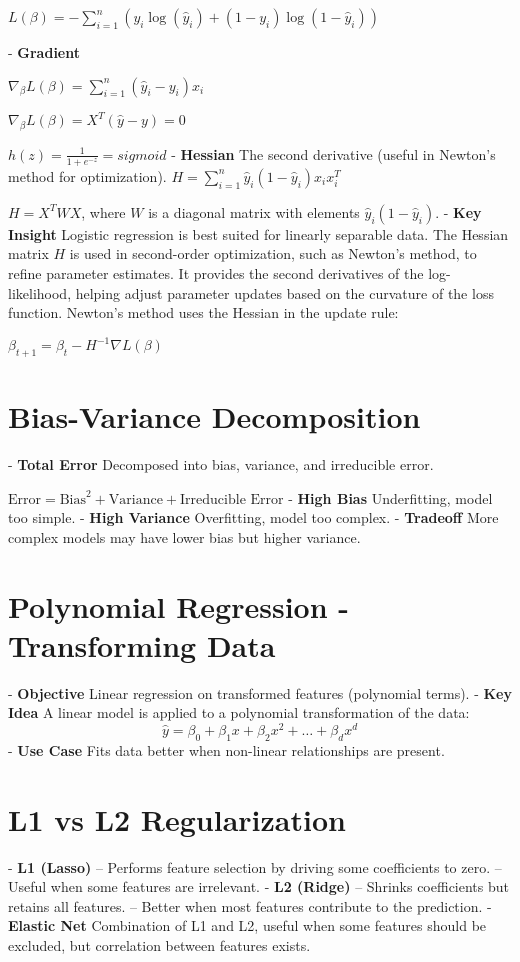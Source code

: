 \documentclass[10pt]{article}
\begin{document}
\begin{multicols}{2}
  $L(\beta) = - \sum_{i=1}^{n} \left( y_i \log(\hat{y}_i) + (1 - y_i) \log(1 - \hat{y}_i) \right)$
  
- \textbf{Gradient} 
  
  $\nabla_{\beta} L(\beta) = \sum_{i=1}^{n} \left( \hat{y}_i - y_i \right) x_i$
  
  $\nabla_{\beta} L(\beta) = X^T (\hat{y} - y) = 0$

  $h(z) = \frac{1}{1 + e^{-z}} = sigmoid$
- \textbf{Hessian} The second derivative (useful in Newton’s method for optimization).
  $H = \sum_{i=1}^{n} \hat{y}_i (1 - \hat{y}_i) x_i x_i^T$
  
  $H = X^T W X$, where $W$ is a diagonal matrix with elements $\hat{y}_i(1 - \hat{y}_i)$.
- \textbf{Key Insight} Logistic regression is best suited for linearly separable data. The Hessian matrix \( H \) is used in second-order optimization, such as Newton’s method, to refine parameter estimates. It provides the second derivatives of the log-likelihood, helping adjust parameter updates based on the curvature of the loss function.
Newton's method uses the Hessian in the update rule:

$\beta_{t+1} = \beta_t - H^{-1} \nabla L(\beta)$

\section*{Bias-Variance Decomposition}
- \textbf{Total Error} Decomposed into bias, variance, and irreducible error.
  
  $\text{Error} = \text{Bias}^2 + \text{Variance} + \text{Irreducible Error}$
- \textbf{High Bias} Underfitting, model too simple.
- \textbf{High Variance} Overfitting, model too complex.
- \textbf{Tradeoff} More complex models may have lower bias but higher variance.

\section*{Polynomial Regression - Transforming Data}
- \textbf{Objective} Linear regression on transformed features (polynomial terms).
- \textbf{Key Idea} A linear model is applied to a polynomial transformation of the data:
  \[
  \hat{y} = \beta_0 + \beta_1 x + \beta_2 x^2 + \dots + \beta_d x^d
  \]
- \textbf{Use Case} Fits data better when non-linear relationships are present.

\section*{L1 vs L2 Regularization}
- \textbf{L1 (Lasso)}
-- Performs feature selection by driving some coefficients to zero.
-- Useful when some features are irrelevant.
- \textbf{L2 (Ridge)}
-- Shrinks coefficients but retains all features.
-- Better when most features contribute to the prediction.
- \textbf{Elastic Net} Combination of L1 and L2, useful when some features should be excluded, but correlation between features exists.


\end{multicols}
\end{document}
